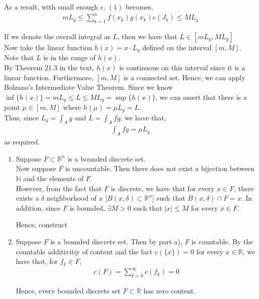 \documentclass[12pt]{article}
\newenvironment{problem}[2][Problem]{\begin{trivlist}
\item[\hskip \labelsep {\bfseries #1}\hskip \labelsep {\bfseries #2.}]}{\end{trivlist}}
\begin{document}
As a result, with small enough $\epsilon$, $(1)$ becomes,
\begin{align*}
m L_g \leq \sum_{k=1}^n f(x_k)  g(x_k) c(J_k) \leq M L_g
\end{align*}

If we denote the overall integral as $L$, then we have that $L \in [mL_g, ML_g]$\\

Now take the linear function $h(x) = x \cdot L_g$ defined on the interval $[m, M]$. Note that $L$ is in the range of $h(x)$.\\

By Theorem 21.3 in the text, $h(x)$ is continuous on this interval since it is a linear function. Furthermore, $[m, M]$ is a connected set. Hence, we can apply Bolzano's Intermediate Value Theorem. Since we know $\inf \{h(x)\} = mL_g \leq L \leq ML_g = \sup \{h(x)\}$, we can assert that there is a point $\mu \in [m, M]$ where $h(\mu) = \mu L_g = L$.\\

Thus, since $L_g = \int_A g$ and $L = \int_A fg$, we have that,
\begin{align*}
\int_A fg = \mu L_g
\end{align*}
as required.

\begin{problem}{3}
\end{problem}

\begin{enumerate}[label=\alph*)]
\item Suppose $F \subset \mathbb{R}^n$ is a bounded discrete set.\\

Now suppose $F$ is uncountable. Then there does not exist a bijection between $\mathbb{N}$ and the elements of $F$.\\

However, from the fact that $F$ is discrete, we have that for every $x \in F$, there exists a $\delta$ neighborhood of $x$ [$B(x, \delta) \subset \mathbb{R}^n$] such that $B(x, \delta) \cap F = x$. In addition, since $F$ is bounded, $\exists M > 0$ such that $|x| \leq M$ for every $x \in F$.

Hence, construct 

\item Suppose $F$ is a bounded discrete set. Then by part a), $F$ is countable. By the countable additivitiy of content and the fact $c(\{x\}) = 0$ for every $x \in \mathbb{R}$, we have that, for $f_k \in F$,
\begin{align*}
c(F) = \sum_{k=0}^{\infty} c(f_k) = 0
\end{align*}

Hence, every bounded discrete set $F \subset \mathbb{R}$ has zero content.

\end{enumerate}
\end{document}
